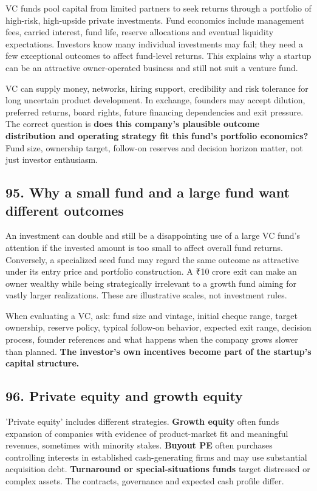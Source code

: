 VC funds pool capital from limited partners to seek returns through a portfolio of high-risk, high-upside private investments. Fund economics include management fees, carried interest, fund life, reserve allocations and eventual liquidity expectations. Investors know many individual investments may fail; they need a few exceptional outcomes to affect fund-level returns. This explains why a startup can be an attractive owner-operated business and still not suit a venture fund.

VC can supply money, networks, hiring support, credibility and risk tolerance for long uncertain product development. In exchange, founders may accept dilution, preferred returns, board rights, future financing dependencies and exit pressure. The correct question is \textbf{does this company's plausible outcome distribution and operating strategy fit this fund's portfolio economics?} Fund size, ownership target, follow-on reserves and decision horizon matter, not just investor enthusiasm.

\subsection{95. Why a small fund and a large fund want different outcomes}


An investment can double and still be a disappointing use of a large VC fund's attention if the invested amount is too small to affect overall fund returns. Conversely, a specialized seed fund may regard the same outcome as attractive under its entry price and portfolio construction. A ₹10 crore exit can make an owner wealthy while being strategically irrelevant to a growth fund aiming for vastly larger realizations. These are illustrative scales, not investment rules.

When evaluating a VC, ask: fund size and vintage, initial cheque range, target ownership, reserve policy, typical follow-on behavior, expected exit range, decision process, founder references and what happens when the company grows slower than planned. \textbf{The investor's own incentives become part of the startup's capital structure.}

\subsection{96. Private equity and growth equity}


'Private equity' includes different strategies. \textbf{Growth equity} often funds expansion of companies with evidence of product-market fit and meaningful revenues, sometimes with minority stakes. \textbf{Buyout PE} often purchases controlling interests in established cash-generating firms and may use substantial acquisition debt. \textbf{Turnaround or special-situations funds} target distressed or complex assets. The contracts, governance and expected cash profile differ.

